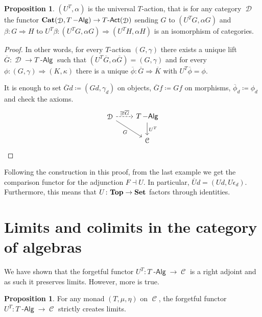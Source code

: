\documentclass[a4paper,11pt,oneside,openany]{scrbook}
\newcommand{\catname}[1]{{\normalfont\textbf{#1}}}
\DeclareMathOperator{\Alg}{-\mathsf{Alg}}
\newcommand{\Set}{\catname{Set}}
\newcommand{\Top}{\catname{Top}}
\newcommand{\Cat}{\catname{Cat}}
\DeclareMathOperator{\C}{\mathcal{C}}
\DeclareMathOperator{\D}{\mathcal{D}}
\theoremstyle{definition}
\theoremstyle{definition}
\newtheorem{prop}[thm]{Proposition}
\begin{document}
\begin{prop}
	$(U^T,\alpha)$ is the universal $T$-action, that is for any category $\D$ the functor $\Cat(\D,T\Alg)\rightarrow T\mbox{-}\mathsf{Act}(\D)$ sending $G$ to $(U^TG,\alpha G)$ and $\beta\colon G\Rightarrow H$ to $U^T\beta\colon(U^TG,\alpha G)\Rightarrow (U^TH,\alpha H)$ is an isomorphism of categories.
\end{prop}

\begin{proof}
	In other words, for every $T$-action $(G,\gamma)$ there exists a unique lift $\overline{G}\colon\D\rightarrow T\Alg$ such that $(U^T\overline{G},\alpha\overline{G})=(G,\gamma)$ and for every $\phi\colon(G,\gamma)\Rightarrow (K,\kappa)$ there is a unique $\overline{\phi}\colon\overline{G}\Rightarrow\overline{K}$ with $U^T\overline{\phi}=\phi$.
	
	It is enough to set $\overline{G}d\coloneqq(Gd,\gamma_d)$ on objects, $\overline{G}f\coloneqq Gf$ on morphisms, $\overline{\phi}_d\coloneqq\phi_d$ and check the axioms.
	\[
		\begin{tikzcd}
			\D\ar[r, dashed, "\exists!\overline{G}"]\ar[dr, swap, "G"]
			& T\Alg\ar[d, "U^T"] \\
			& \C                  
		\end{tikzcd}    
	\]			
\end{proof}

Following the construction in this proof, from the last example we get the comparison functor for the adjunction $F\dashv U$. In particular, $\overline{U}d=(Ud,U\epsilon_d)$. Furthermore, this means that $U\colon\Top\rightarrow\Set$ factors through identities.


\section{Limits and colimits in the category of algebras}

We have shown that the forgetful functor $U^T\colon T\Alg\rightarrow\C$ is a right adjoint and as such it preserves limits. However, more is true.

\begin{prop}\label{create lims}
	For any monad $(T,\mu,\eta)$ on $\C$, the forgetful functor $U^T\colon T\Alg\rightarrow\C$ strictly creates limits.
\end{prop}
\end{document}
